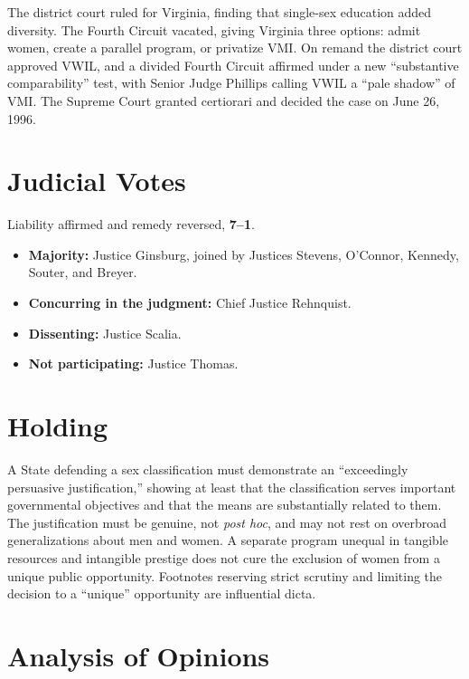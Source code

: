 \documentclass[12pt]{article}
\begin{document}
The district court ruled for Virginia, finding that single-sex education added diversity. The Fourth Circuit vacated, giving Virginia three options: admit women, create a parallel program, or privatize VMI. On remand the district court approved VWIL, and a divided Fourth Circuit affirmed under a new ``substantive comparability'' test, with Senior Judge Phillips calling VWIL a ``pale shadow'' of VMI. The Supreme Court granted certiorari and decided the case on June 26, 1996.

\section{Judicial Votes}

Liability affirmed and remedy reversed, \textbf{7--1}.
\begin{itemize}
\item \textbf{Majority:} Justice Ginsburg, joined by Justices Stevens, O'Connor, Kennedy, Souter, and Breyer.
\item \textbf{Concurring in the judgment:} Chief Justice Rehnquist.
\item \textbf{Dissenting:} Justice Scalia.
\item \textbf{Not participating:} Justice Thomas.
\end{itemize}

\section{Holding}

A State defending a sex classification must demonstrate an ``exceedingly persuasive justification,'' showing at least that the classification serves important governmental objectives and that the means are substantially related to them. The justification must be genuine, not \textit{post hoc}, and may not rest on overbroad generalizations about men and women. A separate program unequal in tangible resources and intangible prestige does not cure the exclusion of women from a unique public opportunity. Footnotes reserving strict scrutiny and limiting the decision to a ``unique'' opportunity are influential dicta.

\section{Analysis of Opinions}
\end{document}
